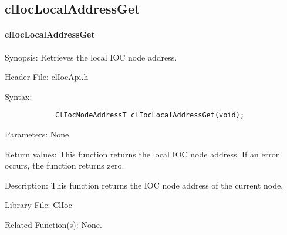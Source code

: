 \begin{flushleft}
\subsection{clIocLocalAddressGet}
\hypertarget{pageioc128}{}\paragraph{cl\-Ioc\-Local\-Address\-Get}\label{pageioc128}
\begin{Desc}
\item[Synopsis:]Retrieves the local IOC node address.\end{Desc}
\begin{Desc}
\item[Header File:]clIocApi.h\end{Desc}
\begin{Desc}
\item[Syntax:]

\footnotesize\begin{verbatim}            ClIocNodeAddressT clIocLocalAddressGet(void);
\end{verbatim}
\normalsize
\end{Desc}
\begin{Desc}
\item[Parameters:]None.\end{Desc}
\begin{Desc}
\item[Return values:]This function returns the local IOC node address. If an error occurs, the function returns zero.\end{Desc}
\begin{Desc}
\item[Description:]This function returns the IOC node address of the current node.\end{Desc}
\begin{Desc}
\item[Library File:]Cl\-Ioc\end{Desc}
\begin{Desc}
\item[Related Function(s):]None. \end{Desc}
\newpage



\end{flushleft}
